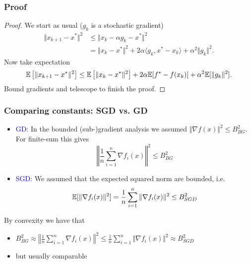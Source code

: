 \documentclass[aspectratio=149]{beamer}
\begin{document}
\begin{frame}
  \frametitle{Proof}
  \begin{proof}

  We start as usual ($g_k$ is a stochastic gradient)
  \begin{equation}
    \begin{aligned}
      \Vert x_{k+1} - x^* \Vert^2 &\le \Vert x_k - \alpha g_k - x^* \Vert^2 \\
      &= \Vert x_k-x^* \Vert^2 + 2 \alpha \langle g_k, x^*-x_k \rangle + \alpha^2 \Vert g_k \Vert^2.
    \end{aligned}
  \end{equation}
  Now take expectation
  \begin{equation}
      \mathbb{E} \left[\Vert x_{k+1} - x^* \Vert^2\right] \le \mathbb{E} \left[\Vert x_k-x^* \Vert^2\right] + 2 \alpha \mathbb{E}[f^*- f(x_k)]+ \alpha^2 \mathbb{E}[\Vert g_k \Vert^2].
  \end{equation}
  Bound gradients and telescope to finish the proof.
  \end{proof}
\end{frame}

\begin{frame}
  \frametitle{Comparing constants: SGD vs. GD}
  \begin{itemize}
    \item \textcolor{blue}{GD:} In the bounded (sub-)gradient analysis we assumed $\Vert \nabla f(x) \Vert^2 \le B_{BG}^2$. For finite-sum this gives
          \begin{equation}
            \left\Vert \frac{1}{n}\sum_{i=1}^{n}\nabla f_i(x) \right\Vert^2 \le B_{BG}^2
          \end{equation}
    \item \textcolor{blue}{SGD:} We assumed that the expected squared norm are bounded, i.e.
          \begin{equation}
            \mathbb{E}[ \Vert \nabla f_i(x) \Vert^2 ] = \frac{1}{n} \sum_{i=1}^{n} \Vert \nabla f_i(x) \Vert^2 \le B_{SGD}^2
          \end{equation}
  \end{itemize}

  By convexity we have that
  \begin{itemize}
    \item $B_{BG}^2 \approx \left\Vert \frac{1}{n}\sum_{i=1}^{n}\nabla f_i(x) \right\Vert^2 \le \frac{1}{n} \sum_{i=1}^{n} \Vert \nabla f_i(x) \Vert^2 \approx B_{SGD}^2$
    \item but usually comparable
  \end{itemize}
\end{frame}
\end{document}
